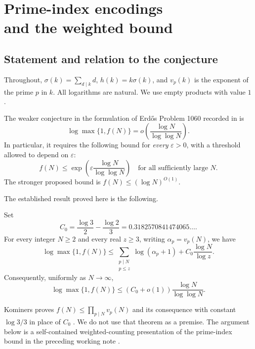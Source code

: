 \chapter[Prime-index encodings and the weighted bound]{Prime-index encodings\\and the weighted bound}\label{ch:weighted}
\section{Statement and relation to the conjecture}
Throughout, $\sigma(k)=\sum_{d\mid k}d$, $h(k)=k\sigma(k)$, and $v_p(k)$ is the exponent of the prime $p$ in $k$. All logarithms are natural. We use empty products with value $1$.

The weaker conjecture in the formulation of Erd\H{o}s Problem 1060 recorded in \cite{kominers} is
\begin{equation}\label{weighted:eq:conjecture}
\log\max\{1,f(N)\}=o\!\left(\frac{\log N}{\log\log N}\right).
\end{equation}
In particular, it requires the following bound for \emph{every} $\varepsilon>0$, with a threshold allowed to depend on $\varepsilon$:
\[
f(N)\le\exp\!\left(\varepsilon\frac{\log N}{\log\log N}\right)
\quad\text{for all sufficiently large }N.
\]
The stronger proposed bound is $f(N)\le(\log N)^{O(1)}$.

The established result proved here is the following.
\begin{theorem}\label{weighted:thm:main}
Set
\[
C_0=\frac{\log3}{2}-\frac{\log2}{3}=0.3182570841474065\ldots.
\]
For every integer $N\ge2$ and every real $z\ge3$, writing $\alpha_p=v_p(N)$, we have
\begin{equation}\label{weighted:eq:finite}
\boxed{\log\max\{1,f(N)\}\le
\sum_{\substack{p\mid N\\p\le z}}\log(\alpha_p+1)
+C_0\frac{\log N}{\log z}.}
\end{equation}
Consequently, uniformly as $N\to\infty$,
\begin{equation}\label{weighted:eq:asymptotic}
\boxed{\log\max\{1,f(N)\}\le
(C_0+o(1))\frac{\log N}{\log\log N}.}
\end{equation}
\end{theorem}

Kominers proves $f(N)\le\prod_{p\mid N}v_p(N)$ and its consequence with constant $\log3/3$ in place of $C_0$ \cite[Theorem 1.2 and Corollary 1.3]{kominers}. We do not use that theorem as a premise. The argument below is a self-contained weighted-counting presentation of the prime-index bound in the preceding working note \cite{internal}.


